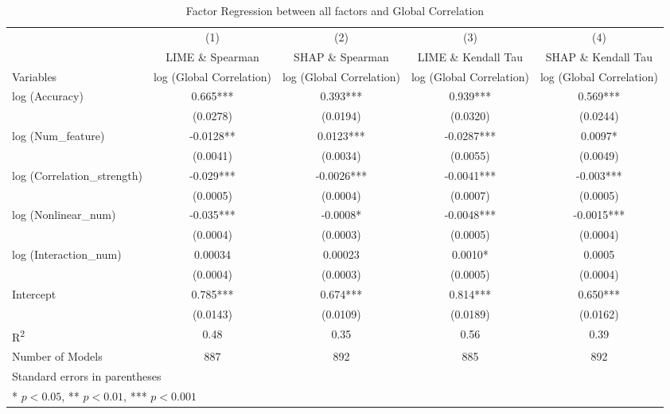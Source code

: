 \documentclass[mnsc,blindrev]{informs3}
\begin{document}
\begin{landscape}
\begin{table}[H]
\centering
\caption{Factor Regression between all factors and Global Correlation}
\begin{tabular}{lcccc}
\toprule
 & (1) & (2) & (3) & (4) \\
 & LIME \& Spearman & SHAP \& Spearman & LIME \& Kendall Tau & SHAP \& Kendall Tau \\

Variables & log (Global Correlation) & log (Global Correlation) & log (Global Correlation) & log (Global Correlation) \\
\midrule
log (Accuracy) & 0.665*** & 0.393*** & 0.939*** & 0.569*** \\
 & (0.0278) & (0.0194) & (0.0320) & (0.0244) \\
log (Num\_feature) & -0.0128** & 0.0123*** & -0.0287*** & 0.0097* \\
 & (0.0041) & (0.0034) & (0.0055) & (0.0049) \\
log (Correlation\_strength) & -0.029*** & -0.0026*** & -0.0041*** & -0.003*** \\
 & (0.0005) & (0.0004) & (0.0007) & (0.0005) \\
log (Nonlinear\_num) & -0.035*** & -0.0008* & -0.0048*** & -0.0015*** \\
 & (0.0004) & (0.0003) & (0.0005) & (0.0004) \\
log (Interaction\_num) & 0.00034 & 0.00023 & 0.0010* & 0.0005 \\
 & (0.0004) & (0.0003) & (0.0005) & (0.0004) \\
Intercept & 0.785*** & 0.674*** & 0.814*** & 0.650*** \\
 & (0.0143) & (0.0109) & (0.0189) & (0.0162) \\
\midrule
R\textsuperscript{2} & 0.48 & 0.35 & 0.56 & 0.39 \\
Number of Models & 887 & 892 & 885 & 892 \\
\bottomrule
\multicolumn{5}{l}{Standard errors in parentheses} \\
\multicolumn{5}{l}{* $p<0.05$, ** $p<0.01$, *** $p<0.001$} \\
\end{tabular}
\end{table}
\end{landscape}
\end{document}
